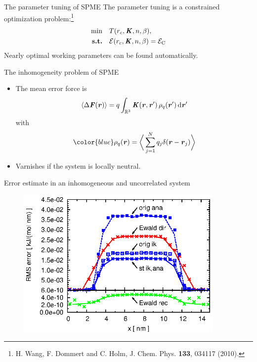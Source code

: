 \documentclass{beamer}
\newcommand{\redc}[1]{{\color{red} #1}}
\newcommand{\bluec}[1]{{\color{blue} #1}}
\renewcommand{\v}[1]{\textbf{\textit{#1}}}
\renewcommand{\d}[1]{\textrm{#1}}
\begin{document}
\begin{frame}{The parameter tuning of SPME }
  The parameter tuning is a constrained optimization problem:\footnote{
    \bluec{H. Wang, F. Dommert and C. Holm, J. Chem. Phys. \textbf{133}, 034117 (2010).}}
  \bluec{
    \begin{align*} 
      \min\quad &  T (r_c, \v K, n, \beta),\\
      \textrm{\textbf{s.t.}}\quad & \mathcal E (r_c, \v K, n, \beta) = \mathcal E_{\textrm{C}}
    \end{align*}}
  \redc{Nearly optimal} working parameters can be found \redc{automatically}.
\end{frame}


\begin{frame}{The inhomogeneity problem of SPME}
  \begin{itemize}
  \item <1-> The mean error force is
    \bluec{
      \begin{align*}
        \langle\Delta\v F(\v r)\rangle
        =
        q\int_{\mathbb R^3}\v K(\v r , \v r')\,\rho_q(\v r')\,\d d\v r'
      \end{align*}
    }
    with
    \begin{align*}
      \bluec{  \rho_q(\v r) = 
        \bigg\langle
        \sum_{j = 1}^N
        q_j\delta(\v r - \v r_j)
        \bigg\rangle
      }
    \end{align*}    
  \item <2-> Varnishes if the system is \redc{locally neutral}.
  \end{itemize}
\end{frame}


\begin{frame}{Error estimate in an inhomogeneous and uncorrelated system}
  \begin{figure}
    \centering
    \includegraphics[width=0.9\textwidth]{figs/long-range-inhomo/rand1-error.eps}
  \end{figure}  
\end{frame}
\end{document}
